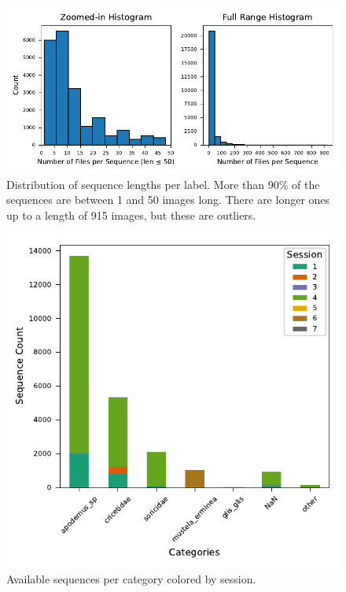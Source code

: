     

    \begin{figure}[H]
    \centering
    \includegraphics{figures/seq_len_histograms.pdf}
    \caption{Distribution of sequence lengths per label. More than 90\% of the sequences are between 1 and 50 images long. There are longer ones up to a length of 915 images, but these are outliers.}
    \label{fig:seq_len_histograms}
    \end{figure}

    \begin{figure}[H]
    \centering
    \includegraphics{figures/label2_session.pdf}
    \caption{Available sequences per category colored by session.}
    \label{fig:sequenceperlabel}
    \end{figure}


